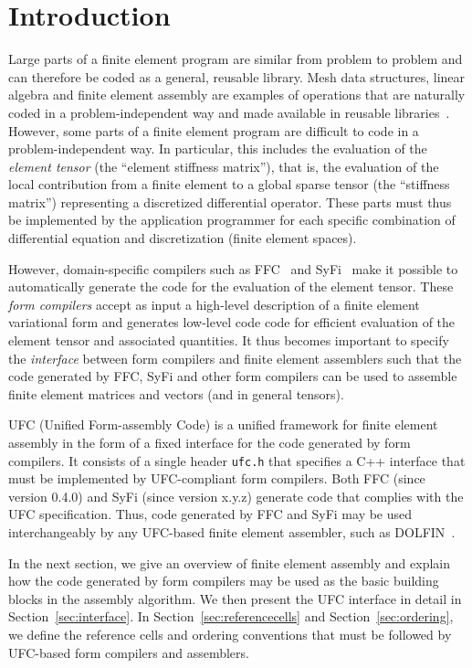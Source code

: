 \chapter{Introduction}
\label{sec:introduction}

Large parts of a finite element program are similar from problem to
problem and can therefore be coded as a general, reusable library.
Mesh data structures, linear algebra and finite element assembly are
examples of operations that are naturally coded in a
problem-independent way and made available in reusable
libraries~\cite{logg:www:fenics,Sundance,dealII,PETSc,Trilinos,www:Diffpack}.
However, some parts of a finite element program are difficult to code
in a problem-independent way. In particular, this includes the
evaluation of the \emph{element tensor} (the ``element stiffness
matrix''), that is, the evaluation of the local contribution from a
finite element to a global sparse tensor (the ``stiffness matrix'')
representing a discretized differential operator. These parts must
thus be implemented by the application programmer for each specific
combination of differential equation and discretization (finite
element spaces).

However, domain-specific compilers such as FFC~\cite{www:ffc,other}
and SyFi~\cite{www:syfi,other} make it possible to automatically
generate the code for the evaluation of the element tensor. These
\emph{form compilers} accept as input a high-level description of a
finite element variational form and generates low-level code code for
efficient evaluation of the element tensor and associated quantities.
It thus becomes important to specify the \emph{interface} between form
compilers and finite element assemblers such that the code generated
by FFC, SyFi and other form compilers can be used to assemble finite
element matrices and vectors (and in general tensors).

UFC (Unified Form-assembly Code) is a unified framework for finite
element assembly in the form of a fixed interface for the code
generated by form compilers. It consists of a single header
\texttt{ufc.h} that specifies a C++ interface that must be implemented
by UFC-compliant form compilers. Both FFC (since version 0.4.0) and
SyFi (since version x.y.z) generate code that complies with the UFC
specification. Thus, code generated by FFC and SyFi may be used
interchangeably by any UFC-based finite element assembler, such as
DOLFIN~\cite{www:dolfin,other}.

In the next section, we give an overview of finite element assembly and
explain how the code generated by form compilers may be used as the
basic building blocks in the assembly algorithm. We then present the
UFC interface in detail in Section~\ref{sec:interface}. In
Section~\ref{sec:referencecells} and Section~\ref{sec:ordering}, we
define the reference cells and ordering conventions that must be
followed by UFC-based form compilers and assemblers.
